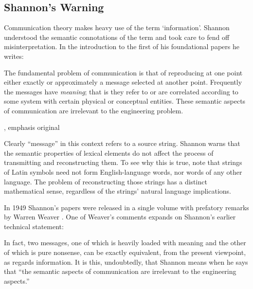 \documentclass[12pt]{article}
\begin{document}

\subsection{Shannon's Warning}\label{subsec:warning}

Communication theory makes heavy use of the term `information'.
Shannon understood the semantic connotations of the term and took care to fend off misinterpretation.
In the introduction to the first of his foundational papers he writes:

\begin{myquote}
The fundamental problem of communication is that of reproducing at one point either exactly or approximately a message selected at another point. Frequently the messages have \emph{meaning}; that is they refer to or are correlated according to some system with certain physical or conceptual entities. These semantic aspects of communication are irrelevant to the engineering problem.
\par\hspace*{\fill}\citet[379]{shannon1948mathematicalc}, emphasis original
\end{myquote}

\noindent Clearly ``message'' in this context refers to a source string.
Shannon warns that the semantic properties of lexical elements do not affect the process of transmitting and reconstructing them.
To see why this is true, note that strings of Latin symbols need not form English-language words, nor words of any other language.
The problem of reconstructing those strings has a distinct mathematical sense, regardless of the strings' natural language implications.

In 1949 Shannon's papers were released in a single volume with prefatory remarks by Warren Weaver \citep{shannon1949mathematical}.
One of Weaver's comments expands on Shannon's earlier technical statement:

\begin{myquote}
In fact, two messages, one of which is heavily loaded with meaning and the other of which is pure nonsense, can be exactly equivalent, from the present viewpoint, as regards information. It is this, undoubtedly, that Shannon means when he says that ``the semantic aspects of communication are irrelevant to the engineering aspects.''
\par\hspace*{\fill}\citet[8]{shannon1949mathematical}
\end{myquote}
\end{document}
